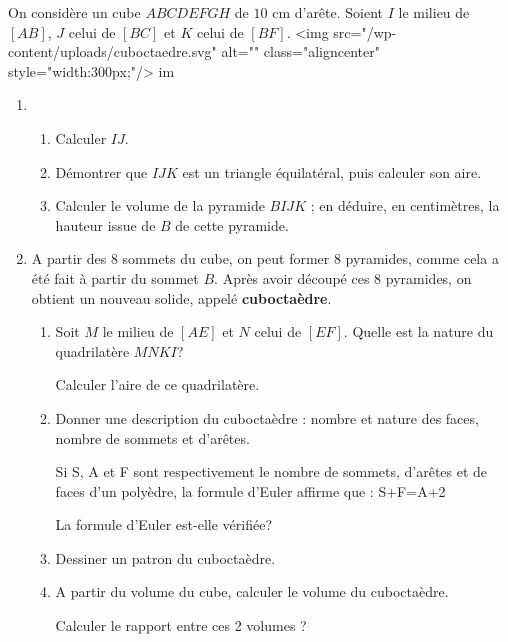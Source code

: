 
%
On considère un cube $ABCDEFGH$ de $10$ cm d'arête. Soient $I$ le milieu de $[AB]$, $J$ celui de $[BC]$ et $K$ celui de $[BF]$.
<img src="/wp-content/uploads/cuboctaedre.svg" alt="" class="aligncenter" style="width:300px;"/>
im
\begin{enumerate}
     \item
     \begin{enumerate}
          \item
          Calculer $IJ$.
          \item
          Démontrer que $IJK$ est un triangle équilatéral, puis calculer son aire.
          \item
          Calculer le volume de la pyramide $BIJK$ ; en déduire, en centimètres, la hauteur issue de $B$ de cette pyramide.
     \end{enumerate}
     \item
     A partir des 8 sommets du cube, on peut former 8 pyramides, comme cela a été fait à partir du sommet $B$. Après avoir découpé ces 8 pyramides, on obtient un nouveau solide, appelé  \textbf{cuboctaèdre}.
     \begin{enumerate}
          \item
          Soit $M$ le milieu de $[AE]$ et $N$ celui de $[EF]$. Quelle est la nature du quadrilatère $MNKI$?
          \par
          Calculer l'aire de ce quadrilatère.
          \item
          Donner une description du cuboctaèdre : nombre et nature des faces, nombre de sommets et d'arêtes.
          \par
          Si S, A et F sont respectivement le nombre de sommets, d'arêtes et de faces d'un polyèdre, la formule d'Euler affirme que : S+F=A+2
          \par
          La formule d'Euler est-elle vérifiée?
          \item
          Dessiner un patron du cuboctaèdre.
          \item
          A partir du volume du cube, calculer le volume du cuboctaèdre.
          \par
          Calculer le rapport entre ces 2 volumes ?
     \end{enumerate}
\end{enumerate}
